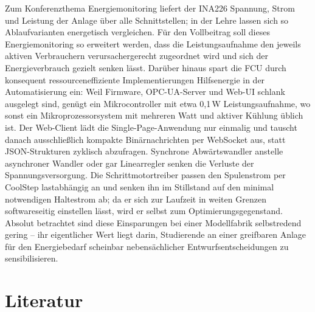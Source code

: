 \documentclass[]{article}%
\begin{document}
Zum Konferenzthema Energiemonitoring liefert der INA226 Spannung, Strom und Leistung der Anlage über alle Schnittstellen; in der Lehre lassen sich so Ablaufvarianten energetisch vergleichen. Für den Vollbeitrag soll dieses Energiemonitoring so erweitert werden, dass die Leistungsaufnahme den jeweils aktiven Verbrauchern verursachergerecht zugeordnet wird und sich der Energieverbrauch gezielt senken lässt. Darüber hinaus spart die FCU durch konsequent ressourceneffiziente Implementierungen Hilfsenergie in der Automatisierung ein: Weil Firmware, OPC-UA-Server und Web-UI schlank ausgelegt sind, genügt ein Mikrocontroller mit etwa 0,1\,W Leistungsaufnahme, wo sonst ein Mikroprozessorsystem mit mehreren Watt und aktiver Kühlung üblich ist. Der Web-Client lädt die Single-Page-Anwendung nur einmalig und tauscht danach ausschließlich kompakte Binärnachrichten per WebSocket aus, statt JSON-Strukturen zyklisch abzufragen. Synchrone Abwärtswandler anstelle asynchroner Wandler oder gar Linearregler senken die Verluste der Spannungsversorgung. Die Schrittmotortreiber passen den Spulenstrom per CoolStep lastabhängig an und senken ihn im Stillstand auf den minimal notwendigen Haltestrom ab; da er sich zur Laufzeit in weiten Grenzen softwareseitig einstellen lässt, wird er selbst zum Optimierungsgegenstand. Absolut betrachtet sind diese Einsparungen bei einer Modellfabrik selbstredend gering -- ihr eigentlicher Wert liegt darin, Studierende an einer greifbaren Anlage für den Energiebedarf scheinbar nebensächlicher Entwurfsentscheidungen zu sensibilisieren.

\section{Literatur}



\end{document}
